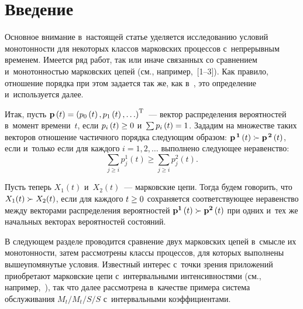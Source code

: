 
  



\thispagestyle{headings}

\begin{multicols}{2}

\label{st\stat}


\section{Введение}

Основное внимание в~настоящей статье уделяется исследованию условий монотонности 
для некоторых классов марковских процессов с~непрерывным временем. Имеется ряд 
работ, так или иначе связанных со сравнением и~монотонностью  марковских цепей 
(см., например,~[1--3]). Как правило, отношение порядка при этом задается  так 
же, как в~\cite{Doorn}, это определение и~используется далее.

Итак, пусть ${\bf p}\left(t\right)\hm =
\left(p_0\left(t\right), p_1\left(t\right), \ldots \right)^{\mathrm{T}}$~--- вектор
распределения вероятностей в~момент времени~$t$, если $p_i\left(t\right)\hm\geq 0$ 
и~$\sum p_i\left(t\right)\hm= 1$. Зададим на множестве таких векторов отношение 
частичного порядка следующим образом: ${\bf p^{\,1}}\left(t\right) \hm\succ{\bf 
p^{\,2}}\left(t\right)$, если и~только если для каждого $i = 1, 2, \ldots$ 
выполнено следующее неравенство:
        \begin{equation*}
        \sum\limits_{j  \geq i} p^1_j\left(t\right)\geq \sum\limits_{ j  \geq  i} 
p^2_j\left(t\right).
    \end{equation*}
    
Пусть теперь $X_{1}(t)$ и~$X_{2}(t)$~--- марковские цепи.
Тогда  будем говорить, что $X_1(t) \hm\succ X_2(t) $, если для каждого $t\hm\geq 0$ 
сохраняется соответствующее неравенство между векторами распределения 
вероятностей ${\bf p^1}\left(t\right) \hm\succ{\bf p^2}\left(t\right)$ при одних 
и~тех же начальных векторах вероятностей состояний.

В следующем разделе проводится сравнение двух  марковских цепей в~смысле их 
монотонности, затем  рассмотрены классы процессов, для которых выполнены 
вышеупомянутые условия. Известный интерес с~точки зрения приложений приобретают 
марковские цепи с~интервальными интенсивностями (см., например,~\cite{Chitraganti, Xie}),  
так что далее рас\-смот\-ре\-на в~качестве примера система 
обслуживания $M_t/M_t/S/S$ с~интервальными коэффициентами.


\end{multicols}
